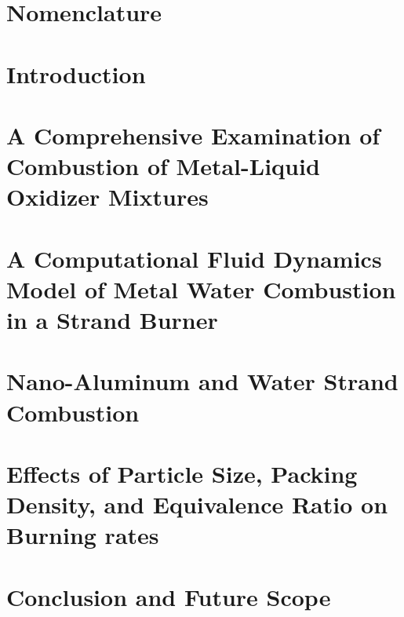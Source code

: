 \documentclass[12pt]{report}
\begin{document}
\newpage
{}
{%
\let\oldnumberline\numberline%
\renewcommand{\numberline}[1]{\figurename~#1: }%
\setlength{\cftfignumwidth}{5em} %
\listoffigures%
}

\newpage
{}
{%
\let\oldnumberline\numberline%
\renewcommand{\numberline}[1]{\tablename~#1: }%
\setlength{\cfttabnumwidth}{4.5em} %
\listoftables%
}


\chapter*{Nomenclature}


\chapter{Introduction}

	
\chapter{A Comprehensive Examination of Combustion of Metal-Liquid Oxidizer Mixtures}


\chapter{A Computational Fluid Dynamics Model of Metal Water Combustion in a Strand Burner}


\chapter{Nano-Aluminum and Water Strand Combustion}


\chapter{Effects of Particle Size, Packing Density, and Equivalence Ratio on Burning rates}


\chapter{Conclusion and Future Scope}


\appendix %
\renewcommand{\thechapter}{\Alph{chapter}} %



\printbibliography
\end{document}
